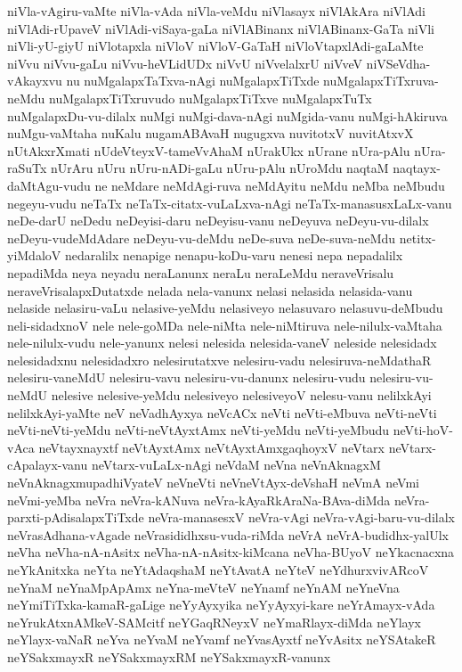 {niVla-vAgiru-vaMte
niVla-vAda
niVla-veMdu
niVlasayx
niVlAkAra
niVlAdi
niVlAdi-rUpaveV
niVlAdi-viSaya-gaLa
niVlABinanx
niVlABinanx-GaTa
niVli
niVli-yU-giyU
niVlotapxla
niVloV
niVloV-GaTaH
niVloVtapxlAdi-gaLaMte
niVvu
niVvu-gaLu
niVvu-heVLidUDx
niVvU
niVvelalxrU
niVveV
niVSeVdha-vAkayxvu
nu
nuMgalapxTaTxva-nAgi
nuMgalapxTiTxde
nuMgalapxTiTxruva-neMdu
nuMgalapxTiTxruvudo
nuMgalapxTiTxve
nuMgalapxTuTx
nuMgalapxDu-vu-dilalx
nuMgi
nuMgi-dava-nAgi
nuMgida-vanu
nuMgi-hAkiruva
nuMgu-vaMtaha
nuKalu
nugamABAvaH
nugugxva
nuvitotxV
nuvitAtxvX
nUtAkxrXmati
nUdeVteyxV-tameVvAhaM
nUrakUkx
nUrane
nUra-pAlu
nUra-raSuTx
nUrAru
nUru
nUru-nADi-gaLu
nUru-pAlu
nUroMdu
naqtaM
naqtayx-daMtAgu-vudu
ne
neMdare
neMdAgi-ruva
neMdAyitu
neMdu
neMba
neMbudu
negeyu-vudu
neTaTx
neTaTx-citatx-vuLaLxva-nAgi
neTaTx-manasusxLaLx-vanu
neDe-darU
neDedu
neDeyisi-daru
neDeyisu-vanu
neDeyuva
neDeyu-vu-dilalx
neDeyu-vudeMdAdare
neDeyu-vu-deMdu
neDe-suva
neDe-suva-neMdu
netitx-yiMdaloV
nedaralilx
nenapige
nenapu-koDu-varu
nenesi
nepa
nepadalilx
nepadiMda
neya
neyadu
neraLanunx
neraLu
neraLeMdu
neraveVrisalu
neraveVrisalapxDutatxde
nelada
nela-vanunx
nelasi
nelasida
nelasida-vanu
nelaside
nelasiru-vaLu
nelasive-yeMdu
nelasiveyo
nelasuvaro
nelasuvu-deMbudu
neli-sidadxnoV
nele
nele-goMDa
nele-niMta
nele-niMtiruva
nele-nilulx-vaMtaha
nele-nilulx-vudu
nele-yanunx
nelesi
nelesida
nelesida-vaneV
neleside
nelesidadx
nelesidadxnu
nelesidadxro
nelesirutatxve
nelesiru-vadu
nelesiruva-neMdathaR
nelesiru-vaneMdU
nelesiru-vavu
nelesiru-vu-danunx
nelesiru-vudu
nelesiru-vu-neMdU
nelesive
nelesive-yeMdu
nelesiveyo
nelesiveyoV
nelesu-vanu
nelilxkAyi
nelilxkAyi-yaMte
neV
neVadhAyxya
neVcACx
neVti
neVti-eMbuva
neVti-neVti
neVti-neVti-yeMdu
neVti-neVtAyxtAmx
neVti-yeMdu
neVti-yeMbudu
neVti-hoV-vAca
neVtayxnayxtf
neVtAyxtAmx
neVtAyxtAmxgaqhoyxV
neVtarx
neVtarx-cApalayx-vanu
neVtarx-vuLaLx-nAgi
neVdaM
neVna
neVnAknagxM
neVnAknagxmupadhiVyateV
neVneVti
neVneVtAyx-deVshaH
neVmA
neVmi
neVmi-yeMba
neVra
neVra-kANuva
neVra-kAyaRkAraNa-BAva-diMda
neVra-parxti-pAdisalapxTiTxde
neVra-manasesxV
neVra-vAgi
neVra-vAgi-baru-vu-dilalx
neVrasAdhana-vAgade
neVrasididhxsu-vuda-riMda
neVrA
neVrA-budidhx-yalUlx
neVha
neVha-nA-nAsitx
neVha-nA-nAsitx-kiMcana
neVha-BUyoV
neYkacnacxna
neYkAnitxka
neYta
neYtAdaqshaM
neYtAvatA
neYteV
neYdhurxvivARcoV
neYnaM
neYnaMpApAmx
neYna-meVteV
neYnamf
neYnAM
neYneVna
neYmiTiTxka-kamaR-gaLige
neYyAyxyika
neYyAyxyi-kare
neYrAmayx-vAda
neYrukAtxnAMkeV-SAMcitf
neYGaqRNeyxV
neYmaRlayx-diMda
neYlayx
neYlayx-vaNaR
neYva
neYvaM
neYvamf
neYvasAyxtf
neYvAsitx
neYSAtakeR
neYSakxmayxR
neYSakxmayxRM
neYSakxmayxR-vanunx
}
